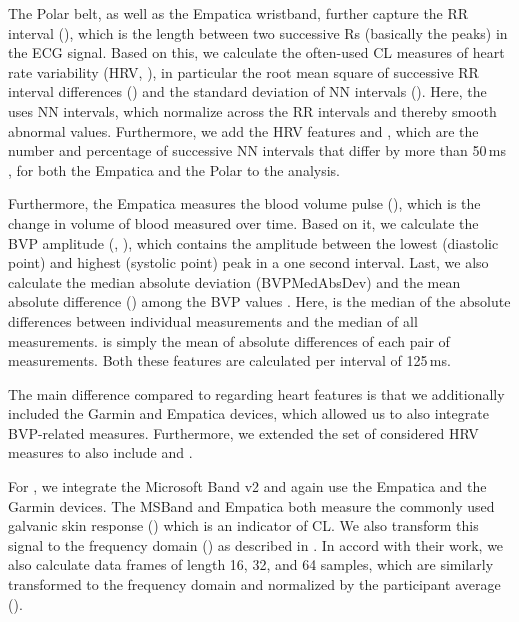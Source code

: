 \documentclass[output=paper]{langsci/langscibook}
\begin{document}
The Polar belt, as well as the Empatica wristband, further capture the RR interval (\rr{}{}), which is the length between two successive Rs (basically the peaks) in the ECG signal.
Based on this, we calculate the often-used CL measures of heart rate variability (HRV, \citealt{rowe1998heart}), in particular the root mean square of successive RR interval differences (\rmssd{}{}) and the standard deviation of NN intervals (\sdnn{}{}). Here, the \sdnn{}{} uses NN intervals, which normalize across the RR intervals and thereby smooth abnormal values.
Furthermore, we add the HRV features \nn{}{} and \pnn{}{}, which are the number and percentage of successive NN intervals that differ by more than 50\,ms \citep{shaffer2017overview}, for both the Empatica and the Polar to the analysis.

Furthermore, the Empatica measures the blood volume pulse (\bvpempatica{}), which is the change in volume of blood measured over time. Based on it, we calculate the BVP amplitude (\bvpamplitudeempatica{}, \citealt{iani2004effects}), which contains the amplitude between the lowest (diastolic point) and highest (systolic point) peak in a one second interval. Last, we also calculate the median absolute deviation (BVPMed\-AbsDev) and the mean absolute difference (\bvpmeanadempatica{}) among the BVP values \citep{haapalainen2010psycho}. Here, \bvpmedadempatica{} is the median of the absolute differences between individual measurements and the median of all measurements. \bvpmeanadempatica{} is simply the mean of absolute differences of each pair of measurements. Both these features are calculated per interval of 125\,ms.

The main difference compared to \citet{herbig2019mt} regarding heart features is that we additionally included the Garmin and Empatica devices, which allowed us to also integrate BVP-related measures. Furthermore, we extended the set of considered HRV measures to also include \nn{}{} and \pnn{}{}.


For , we integrate the Microsoft Band v2 and again use the Empatica and the Garmin devices.
The MSBand and Empatica both measure the commonly used galvanic skin response (\gsr{}{}) which is an indicator of CL. We also transform this signal to the frequency domain (\freqgsr{}{}) as described in \cite{chen2016robust}. In accord with their work, we also calculate data frames of length 16, 32, and 64 samples, which are similarly transformed to the frequency domain and normalized by the participant average (\freqframegsr{}{}).
\end{document}
